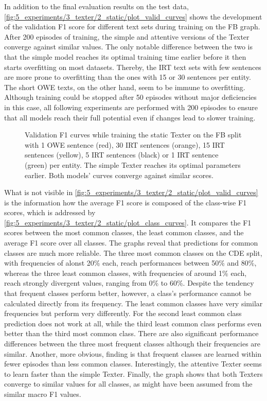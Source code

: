 In addition to the final evaluation results on the test data, \autoref{fig:5_experiments/3_texter/2_static/plot_valid_curves} shows the development of the validation F1 score for different text sets during training on the FB graph. After 200 episodes of training, the simple and attentive versions of the Texter converge against similar values. The only notable difference between the two is that the simple model reaches its optimal training time earlier before it then starts overfitting on most datasets. Thereby, the IRT text sets with few sentences are more prone to overfitting than the ones with 15 or 30 sentences per entity. The short OWE texts, on the other hand, seem to be immune to overfitting. Although training could be stopped after 50 episodes without major deficiencies in this case, all following experiments are performed with 200 episodes to ensure that all models reach their full potential even if changes lead to slower training.

\begin{figure}[t]
    \centering
    
    \caption{Validation F1 curves while training the static Texter on the FB split with 1 OWE sentence (red), 30 IRT sentences (orange), 15 IRT sentences (yellow), 5 IRT sentences (black) or 1 IRT sentence (green) per entity. The simple Texter reaches its optimal parameters earlier. Both models' curves converge against similar scores.}
    \label{fig:5_experiments/3_texter/2_static/plot_valid_curves}
\end{figure}

What is not visible in \autoref{fig:5_experiments/3_texter/2_static/plot_valid_curves} is the information how the average F1 score is composed of the class-wise F1 scores, which is addressed by \autoref{fig:5_experiments/3_texter/2_static/plot_class_curves}. It compares the F1 scores between the most common classes, the least common classes, and the average F1 score over all classes. The graphs reveal that predictions for common classes are much more reliable. The three most common classes on the CDE split, with frequencies of alonst 20\% each, reach performances between 50\% and 80\%, whereas the three least common classes, with frequencies of around 1\% each, reach strongly divergent values, ranging from 0\% to 60\%. Despite the tendency that frequent classes perform better, however, a class's performance cannot be calculated directly from its frequency. The least common classes have very similar frequencies but perform very differently. For the second least common class prediction does not work at all, while the third least common class performs even better than the third most common class. There are also significant performance differences between the three most frequent classes although their frequencies are similar. Another, more obvious, finding is that frequent classes are learned within fewer episodes than less common classes. Interestingly, the attentive Texter seems to learn faster than the simple Texter. Finally, the graph shows that both Texters converge to similar values for all classes, as might have been assumed from the similar macro F1 values.

